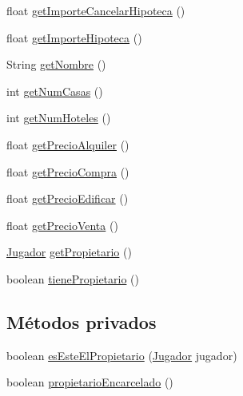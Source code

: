 \begin{DoxyCompactItemize}
float \hyperlink{classcivitas_1_1TituloPropiedad_a02c54372a15432b602c8a0bfee1a2876}{get\+Importe\+Cancelar\+Hipoteca} ()
\item 
float \hyperlink{classcivitas_1_1TituloPropiedad_a194b2337d9aa79339654b680d6413940}{get\+Importe\+Hipoteca} ()
\item 
String \hyperlink{classcivitas_1_1TituloPropiedad_aa312f47365906e18b3d55252638c5705}{get\+Nombre} ()
\item 
int \hyperlink{classcivitas_1_1TituloPropiedad_ae424998d9017e8fc1d862c0c170b982f}{get\+Num\+Casas} ()
\item 
int \hyperlink{classcivitas_1_1TituloPropiedad_ab89ae501ad7ed7ddd658f117fb2cd794}{get\+Num\+Hoteles} ()
\item 
float \hyperlink{classcivitas_1_1TituloPropiedad_aa79c195a743544d869254bdd9e327c18}{get\+Precio\+Alquiler} ()
\item 
float \hyperlink{classcivitas_1_1TituloPropiedad_aa4a37b3b373b67bf57de4ff9c052e2cc}{get\+Precio\+Compra} ()
\item 
float \hyperlink{classcivitas_1_1TituloPropiedad_aa5ebf334114985e75d4c293107a3367f}{get\+Precio\+Edificar} ()
\item 
float \hyperlink{classcivitas_1_1TituloPropiedad_a1730fca9c95b2c3d538fbd63113085c7}{get\+Precio\+Venta} ()
\item 
\hyperlink{classcivitas_1_1Jugador}{Jugador} \hyperlink{classcivitas_1_1TituloPropiedad_ae109616f7c5c37f25ab42be9afd77324}{get\+Propietario} ()
\item 
boolean \hyperlink{classcivitas_1_1TituloPropiedad_a022213f4811b8a990632665137752415}{tiene\+Propietario} ()
\end{DoxyCompactItemize}
\subsection*{Métodos privados}
\begin{DoxyCompactItemize}
\item 
boolean \hyperlink{classcivitas_1_1TituloPropiedad_a90576263833e66db28713a4e5cc19a62}{es\+Este\+El\+Propietario} (\hyperlink{classcivitas_1_1Jugador}{Jugador} jugador)
\item 
boolean \hyperlink{classcivitas_1_1TituloPropiedad_ad46ff96f913a38c805c938a15f307cf7}{propietario\+Encarcelado} ()
\end{DoxyCompactItemize}
